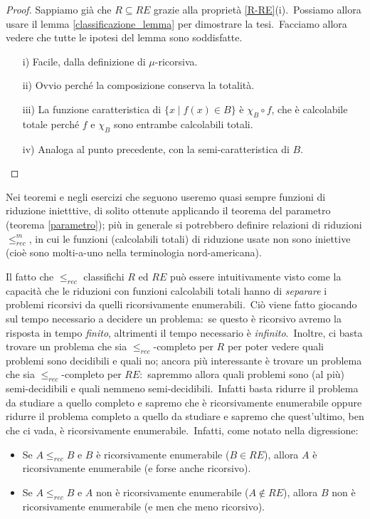 \begin{proof}
    Sappiamo già che $R \subseteq RE$ grazie alla proprietà \ref{R-RE}(i).\
    Possiamo allora usare il lemma \ref{classificazione_lemma} per dimostrare la tesi.\
    Facciamo allora vedere che tutte le ipotesi del lemma sono soddisfatte.
    \begin{itemize}
        \item[i)] Facile, dalla definizione di $\mu$-ricorsiva.
        \item[ii)] Ovvio perché la composizione conserva la totalità.
        \item[iii)] La funzione caratteristica di $\{x \mid f(x) \in B\}$ è $\chi_B \circ f$, che è calcolabile totale perché $f$ e $\chi_B$ sono entrambe calcolabili totali.
        \item[iv)] Analoga al punto precedente, con la semi-caratteristica di $B$.
    \end{itemize}
\end{proof}

\noindent Nei teoremi e negli esercizi che seguono useremo quasi sempre funzioni di riduzione inietttive, di solito ottenute applicando il teorema del parametro (teorema \ref{parametro}); più in generale si potrebbero definire relazioni di riduzioni $\leqslant_{rec}^m$, in cui le funzioni (calcolabili totali) di riduzione usate non sono iniettive (cioè sono molti-a-uno nella terminologia nord-americana).\

\vspace{12pt}

\noindent Il fatto che $\leqslant_{rec}$ classifichi $R$ ed $RE$ può essere intuitivamente visto come la capacità che le riduzioni con funzioni calcolabili totali hanno di \textit{separare} i problemi ricorsivi da quelli ricorsivamente enumerabili.\
Ciò viene fatto giocando sul tempo necessario a decidere un problema:\ se questo è ricorsivo avremo la risposta in tempo \textit{finito}, altrimenti il tempo necessario è \textit{infinito}.\
Inoltre, ci basta trovare un problema che sia $\leqslant_{rec}$-completo per $R$ per poter vedere quali problemi sono decidibili e quali no; ancora più interessante è trovare un problema che sia $\leqslant_{rec}$-completo per $RE$:\ sapremmo allora quali problemi sono (al più) semi-decidibili e quali nemmeno semi-decidibili.\
Infatti basta ridurre il problema da studiare a quello completo e sapremo che è ricorsivamente enumerabile oppure ridurre il problema completo a quello da studiare e sapremo che quest'ultimo, ben che ci vada, è ricorsivamente enumerabile.\
Infatti, come notato nella digressione:
\begin{itemize}
    \item Se $A \leqslant_{rec} B$ e $B$ è ricorsivamente enumerabile ($B \in RE$), allora $A$ è ricorsivamente enumerabile (e forse anche ricorsivo).
    \item Se $A \leqslant_{rec} B$ e $A$ non è ricorsivamente enumerabile ($A \notin RE$), allora $B$ non è ricorsivamente enumerabile (e men che meno ricorsivo).
\end{itemize}


